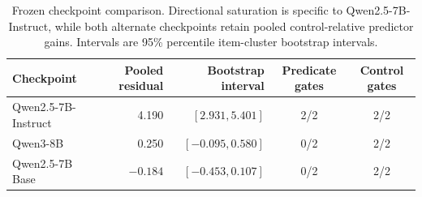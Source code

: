 \begin{table}[H]
\centering
\small
\begin{tabular}{lrrcc}
\toprule
Checkpoint & Pooled residual & Bootstrap interval & Predicate gates & Control gates \\
\midrule
Qwen2.5-7B-Instruct & 4.190 & $[2.931,5.401]$ & 2/2 & 2/2 \\
Qwen3-8B & 0.250 & $[-0.095,0.580]$ & 0/2 & 2/2 \\
Qwen2.5-7B Base & $-0.184$ & $[-0.453,0.107]$ & 0/2 & 2/2 \\
\bottomrule
\end{tabular}
\caption{Frozen checkpoint comparison. Directional saturation is specific to
Qwen2.5-7B-Instruct, while both alternate checkpoints retain pooled
control-relative predictor gains. Intervals are 95\% percentile item-cluster bootstrap intervals.}
\label{tab:checkpoint-boundary}
\end{table}
